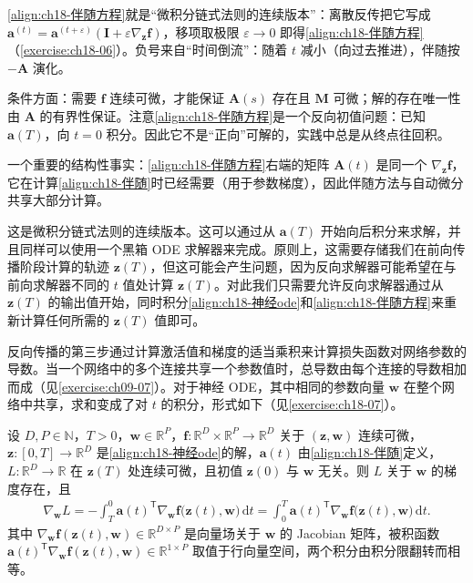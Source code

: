 \documentclass[../../main.tex]{subfiles}
\begin{document}
\begin{remark}
\eqref{align:ch18-伴随方程}就是“微积分链式法则的连续版本”：离散反传把它写成 $\bm{a}^{(t)}=\bm{a}^{(t+\varepsilon)}(\bm{I}+\varepsilon\nabla_{\bm{z}}\bm{f})$，移项取极限 $\varepsilon\to0$ 即得\eqref{align:ch18-伴随方程}（\cref{exercise:ch18-06}）。负号来自“时间倒流”：随着 $t$ 减小（向过去推进），伴随按 $-\bm{A}$ 演化。

条件方面：需要 $\bm{f}$ 连续可微，才能保证 $\bm{A}(s)$ 存在且 $\bm{M}$ 可微；解的存在唯一性由 $\bm{A}$ 的有界性保证。注意\eqref{align:ch18-伴随方程}是一个反向初值问题：已知 $\bm{a}(T)$，向 $t=0$ 积分。因此它不是“正向”可解的，实践中总是从终点往回积。

一个重要的结构性事实：\eqref{align:ch18-伴随方程}右端的矩阵 $\bm{A}(t)$ 是同一个 $\nabla_{\bm{z}}\bm{f}$，它在计算\eqref{align:ch18-伴随}时已经需要（用于参数梯度），因此伴随方法与自动微分共享大部分计算。
\end{remark}

这是微积分链式法则的连续版本。这可以通过从 $\bm{a}(T)$ 开始向后积分来求解，并且同样可以使用一个黑箱 ODE 求解器来完成。原则上，这需要存储我们在前向传播阶段计算的轨迹 $\bm{z}(T)$，但这可能会产生问题，因为反向求解器可能希望在与前向求解器不同的 $t$ 值处计算 $\bm{z}(T)$。对此我们只需要允许反向求解器通过从 $\bm{z}(T)$ 的输出值开始，同时积分\eqref{align:ch18-神经ode}和\eqref{align:ch18-伴随方程}来重新计算任何所需的 $\bm{z}(T)$ 值即可。

反向传播的第三步通过计算激活值和梯度的适当乘积来计算损失函数对网络参数的导数。当一个网络中的多个连接共享一个参数值时，总导数由每个连接的导数相加而成（见\cref{exercise:ch09-07}）。对于神经 ODE，其中相同的参数向量 $\bm{w}$ 在整个网络中共享，求和变成了对 $t$ 的积分，形式如下（见\cref{exercise:ch18-07}）。

\begin{proposition}[参数梯度]\label{proposition:ch18-参数梯度}
设 $D,P\in\mathbb{N}$，$T>0$，$\bm{w}\in\mathbb{R}^{P}$，$\bm{f}:\mathbb{R}^{D}\times\mathbb{R}^{P}\to\mathbb{R}^{D}$ 关于 $(\bm{z},\bm{w})$ 连续可微，$\bm{z}:[0,T]\to\mathbb{R}^{D}$ 是\eqref{align:ch18-神经ode}的解，$\bm{a}(t)$ 由\eqref{align:ch18-伴随}定义，$L:\mathbb{R}^{D}\to\mathbb{R}$ 在 $\bm{z}(T)$ 处连续可微，且初值 $\bm{z}(0)$ 与 $\bm{w}$ 无关。则 $L$ 关于 $\bm{w}$ 的梯度存在，且
\begin{align}
  \nabla_{\bm{w}}L=-\int_{T}^{0}\bm{a}(t)^{\mathsf T}\nabla_{\bm{w}}\bm{f}\big(\bm{z}(t),\bm{w}\big)\,\mathrm{d}t
  =\int_{0}^{T}\bm{a}(t)^{\mathsf T}\nabla_{\bm{w}}\bm{f}\big(\bm{z}(t),\bm{w}\big)\,\mathrm{d}t .\label{align:ch18-参数梯度}
\end{align}
其中 $\nabla_{\bm{w}}\bm{f}(\bm{z}(t),\bm{w})\in\mathbb{R}^{D\times P}$ 是向量场关于 $\bm{w}$ 的 Jacobian 矩阵，被积函数 $\bm{a}(t)^{\mathsf T}\nabla_{\bm{w}}\bm{f}(\bm{z}(t),\bm{w})\in\mathbb{R}^{1\times P}$ 取值于行向量空间，两个积分由积分限翻转而相等。
\end{proposition}
\end{document}

